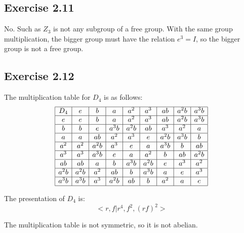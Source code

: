 \documentclass[]{ctexart}
\begin{document}
    \subsection{Exercise 2.11}
    No. Such as $Z_3$ is not any subgroup of a free group. With the same group multiplication, the bigger group must have the relation $e^3=I$, so the bigger group is not a free group. 
    
    \subsection{Exercise 2.12}
    The multiplication table for $D_4$ is as follows:
    \begin{equation*}
    	\begin{array}{|c|c|c|c|c|c|c|c|c|}
    	\hline D_4& e & b & a & a^{2} & a^{3} & a b & a^{2} b & a^{3} b \\
    	\hline e & e & b & a & a^{2} & a^{3} & a b & a^{2} b & a^{3} b \\
    	\hline b & b & e & a^{3} b & a^{2} b & a b & a^{3} & a^{2} & a \\
    	\hline a & a & a b & a^{2} & a^{3} & e & a^{2} b & a^{3} b & b \\
    	\hline a^{2} & a^{2} & a^{2} b & a^{3} & e & a & a^{3} b & b & a b \\
    	\hline a^{3} & a^{3} & a^{3} b & e & a & a^{2} & b & a b & a^{2} b \\
    	\hline a b & a b & a & b & a^{3} b & a^{2} b & e & a^{3} & a^{2} \\
    	\hline a^{2} b & a^{2} b & a^{2} & a b & b & a^{3} b & a & e & a^{3} \\
    	\hline a^{3} b & a^{3} b & a^{3} & a^{2} b & a b & b & a^{2} & a & e \\
    	\hline
    	\end{array}
    \end{equation*}
    
    The presentation of $D_4$ is:
    \begin{equation*}
      <r,f|r^4,f^2,(rf)^2>
    \end{equation*}
    
    The multiplication table is not symmetric, so it is not abelian. 
    
\end{document}
